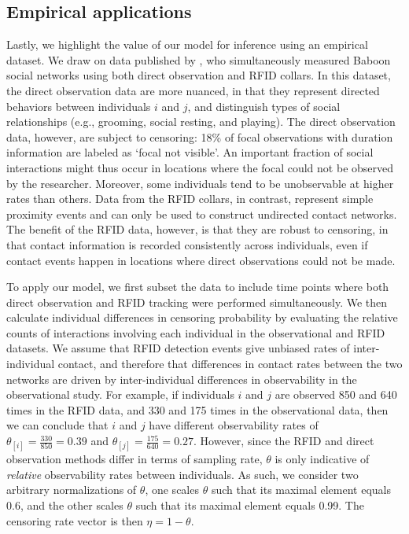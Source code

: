 \documentclass[Afour,sageh,times]{sagej}
\begin{document}
\subsection{Empirical applications}
Lastly, we highlight the value of our model for inference using an empirical dataset. We draw on data published by \citet{gelardi2020measuring}, who simultaneously measured Baboon social networks using both direct observation and RFID collars. In this dataset, the direct observation data are more nuanced, in that they represent directed behaviors between individuals $i$ and $j$, and distinguish types of social relationships (e.g., grooming, social resting, and playing). The direct observation data, however, are subject to censoring: 18\% of focal observations with duration information are labeled as `focal not visible'. An important fraction of social interactions might thus occur in locations where the focal could not be observed by the researcher. Moreover, some individuals tend to be unobservable at higher rates than others. Data from the RFID collars, in contrast, represent simple proximity events and can only be used to construct undirected contact networks. The benefit of the RFID data, however, is that they are robust to censoring, in that contact information is recorded consistently across individuals, even if contact events happen in locations where direct observations could not be made. 

To apply our model, we first subset the \citet{gelardi2020measuring} data to include time points where both direct observation and RFID tracking were performed simultaneously. We then calculate individual differences in censoring probability by evaluating the relative counts of interactions involving each individual in the observational and RFID datasets. We assume that RFID detection events give unbiased rates of inter-individual contact, and therefore that differences in contact rates between the two networks are driven by inter-individual differences in observability in the observational study. For example, if individuals $i$ and $j$ are observed 850 and 640 times in the RFID data, and 330 and 175 times in the observational data, then we can conclude that $i$ and $j$ have different observability rates of $\theta_{[i]}=\tfrac{330}{850}=0.39$ and $\theta_{[j]}=\tfrac{175}{640}=0.27$. 
However, since the RFID and direct observation methods differ in terms of sampling rate, $\theta$ is only indicative of \emph{relative} observability rates between individuals. As such, we consider two arbitrary normalizations of $\theta$, one scales $\theta$ such that its maximal element equals 0.6, and the other scales $\theta$ such that its maximal element equals 0.99. The censoring rate vector is then $\eta=1-\theta$. 
\end{document}
